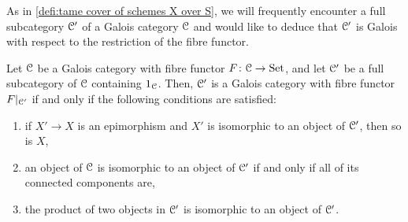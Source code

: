 As in \cref{defi:tame cover of schemes X over S}, we will frequently encounter a full subcategory ${\mathcal C}'$ of a Galois category ${\mathcal C}$ and would like to deduce that ${\mathcal C}'$ is Galois with respect to the restriction of the fibre functor. 

\begin{lem} 
\label{lem:Galois-subcategory-criterion} 
    Let ${\mathcal C}$ be a Galois category with fibre functor $F \colon {\mathcal C}\to \mathrm{Set}$, and let ${\mathcal C}'$ be a full
    subcategory of ${\mathcal C}$ containing $1_{{\mathcal C}}$. Then, ${\mathcal C}'$ is a Galois category with fibre functor $F|_{{\mathcal C}'}$ if and only if the following conditions are satisfied:
    \begin{enumerate}[label=(\roman*)]
        \item 
        \label{lemitem:fullGalCat1}
        if $X'\to X$ is an epimorphism and $X'$ is isomorphic to an object of ${\mathcal C}'$, then so is $X$,
        \item 
        \label{lemitem:fullGalCat2}
        an object of ${\mathcal C}$ is isomorphic to an object of  ${\mathcal C}'$ if and only if all of its connected components are,
        \item 
        \label{lemitem:fullGalCat3}
        the product of two objects in ${\mathcal C}'$ is isomorphic to an object of ${\mathcal C}'$.
    \end{enumerate}
\end{lem}

